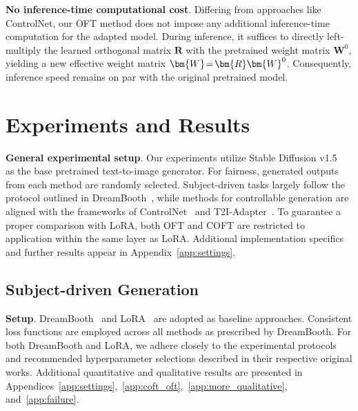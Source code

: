 \textbf{No inference-time computational cost}. Differing from approaches like ControlNet, our OFT method does not impose any additional inference-time computation for the adapted model. During inference, it suffices to directly left-multiply the learned orthogonal matrix $\bm{R}$ with the pretrained weight matrix $\bm{W}^0$, yielding a new effective weight matrix $\thickmuskip=2mu \medmuskip=2mu \bm{W}=\bm{R}\bm{W}^0$. Consequently, inference speed remains on par with the original pretrained model.

\section{Experiments and Results}

\textbf{General experimental setup}. Our experiments utilize Stable Diffusion v1.5~\cite{rombach2022high} as the base pretrained text-to-image generator. For fairness, generated outputs from each method are randomly selected. Subject-driven tasks largely follow the protocol outlined in DreamBooth~\cite{ruiz2023dreambooth}, while methods for controllable generation are aligned with the frameworks of ControlNet~\cite{zhang2023adding} and T2I-Adapter~\cite{mou2023t2i}. To guarantee a proper comparison with LoRA, both OFT and COFT are restricted to application within the same layer as LoRA. Additional implementation specifics and further results appear in Appendix~\ref{app:settings}.

\subsection{Subject-driven Generation}

\textbf{Setup}. DreamBooth~\cite{ruiz2023dreambooth} and LoRA~\cite{hulora2022} are adopted as baseline approaches. Consistent loss functions are employed across all methods as prescribed by DreamBooth. For both DreamBooth and LoRA, we adhere closely to the experimental protocols and recommended hyperparameter selections described in their respective original works. Additional quantitative and qualitative results are presented in Appendices~\ref{app:settings},~\ref{app:coft_oft},~\ref{app:more_qualitative}, and~\ref{app:failure}.

